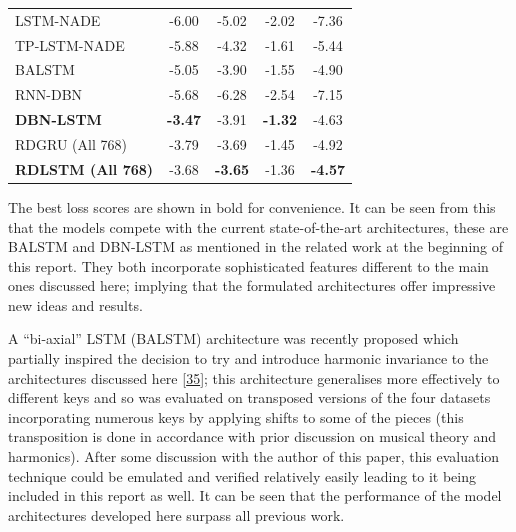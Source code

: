 \documentclass[12pt,]{article}
\begin{document}
\begin{table}[H]
\begin{tabular}{lcccc}
LSTM-NADE         & -6.00                 & -5.02             & -2.02               & -7.36                   \\
TP-LSTM-NADE      & -5.88                 & -4.32             & -1.61               & -5.44                   \\
BALSTM            & -5.05                 & -3.90             & -1.55               & -4.90                   \\
RNN-DBN           & -5.68                 & -6.28             & -2.54               & -7.15                   \\
\textbf{DBN-LSTM} & \textbf{-3.47}        & -3.91             & \textbf{-1.32}      & -4.63                   \\ 
\midrule
RDGRU (All 768)             & -3.79                 & -3.69             & -1.45               & -4.92                   \\
\textbf{RDLSTM (All 768)}   & -3.68                 & \textbf{-3.65}    & -1.36               & \textbf{-4.57}          \\
\bottomrule
\end{tabular}
\end{table}

The best loss scores are shown in bold for convenience. It can be seen
from this that the models compete with the current state-of-the-art
architectures, these are BALSTM and DBN-LSTM as mentioned in the related
work at the beginning of this report. They both incorporate
sophisticated features different to the main ones discussed here;
implying that the formulated architectures offer impressive new ideas
and results.

A ``bi-axial'' LSTM (BALSTM) architecture was recently proposed which
partially inspired the decision to try and introduce harmonic invariance
to the architectures discussed here
{[}\protect\hyperlink{ref-johnson2017generating}{35}{]}; this
architecture generalises more effectively to different keys and so was
evaluated on transposed versions of the four datasets incorporating
numerous keys by applying shifts to some of the pieces (this
transposition is done in accordance with prior discussion on musical
theory and harmonics). After some discussion with the author of this
paper, this evaluation technique could be emulated and verified
relatively easily leading to it being included in this report as well.
It can be seen that the performance of the model architectures developed
here surpass all previous work.
\end{document}
